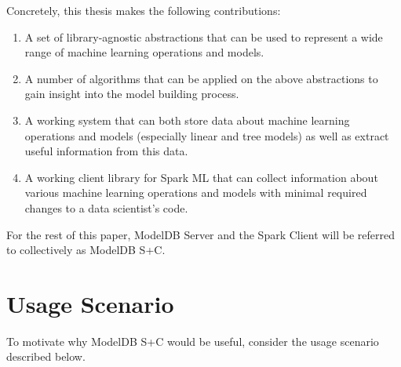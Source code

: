 Concretely, this thesis makes the following contributions:

\begin{enumerate}
  \item A set of library-agnostic abstractions that can be used to
    represent a wide range of machine learning operations and models.
  \item A number of algorithms that can be applied on the above abstractions
    to gain insight into the model building process.
  \item A working system that can both store data about 
    machine learning operations and models (especially linear and tree models) 
    as well as extract useful information from this data.
  \item A working client library for Spark ML that can collect information 
    about various  machine learning operations and models with 
    minimal required changes to a data scientist's code.
\end{enumerate}

For the rest of this paper, ModelDB Server and the Spark Client will be referred
to collectively as ModelDB S+C.

\section{Usage Scenario}
To motivate why ModelDB S+C would be useful, consider the usage scenario
described below.

